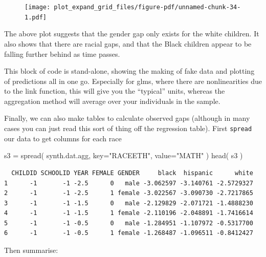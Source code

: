 \documentclass[
  letterpaper,
  DIV=11,
  numbers=noendperiod]{scrreprt}
\newenvironment{Shaded}{\begin{snugshade}}{\end{snugshade}}
\newcommand{\AttributeTok}[1]{\textcolor[rgb]{0.49,0.56,0.16}{#1}}
\newcommand{\FunctionTok}[1]{\textcolor[rgb]{0.02,0.16,0.49}{#1}}
\newcommand{\NormalTok}[1]{\textcolor[rgb]{0.00,0.44,0.13}{#1}}
\newcommand{\OtherTok}[1]{\textcolor[rgb]{0.00,0.44,0.13}{#1}}
\newcommand{\StringTok}[1]{\textcolor[rgb]{0.25,0.44,0.63}{#1}}
\begin{document}
\begin{figure}[H]

{\centering \texttt{[image: plot\_expand\_grid\_files/figure-pdf/unnamed-chunk-34-1.pdf]}

}

\end{figure}

The above plot suggests that the gender gap only exists for the white
children. It also shows that there are racial gaps, and that the Black
children appear to be falling further behind as time passes.

This block of code is stand-alone, showing the making of fake data and
plotting of predictions all in one go. Especially for glms, where there
are nonlinearities due to the link function, this will give you the
``typical'' units, whereas the aggregation method will average over your
individuals in the sample.

Finally, we can also make tables to calculate observed gaps (although in
many cases you can just read this sort of thing off the regression
table). First \texttt{spread} our data to get columns for each race

\begin{Shaded}
\begin{Highlighting}[]
\NormalTok{s3 }\OtherTok{=} \FunctionTok{spread}\NormalTok{( synth.dat.agg, }\AttributeTok{key=}\StringTok{"RACEETH"}\NormalTok{, }\AttributeTok{value=}\StringTok{"MATH"}\NormalTok{ )}
\FunctionTok{head}\NormalTok{( s3 )}
\end{Highlighting}
\end{Shaded}

\begin{verbatim}
  CHILDID SCHOOLID YEAR FEMALE GENDER     black  hispanic      white
1      -1       -1 -2.5      0   male -3.062597 -3.140761 -2.5729327
2      -1       -1 -2.5      1 female -3.022567 -3.090730 -2.7217865
3      -1       -1 -1.5      0   male -2.129829 -2.071721 -1.4888230
4      -1       -1 -1.5      1 female -2.110196 -2.048891 -1.7416614
5      -1       -1 -0.5      0   male -1.284951 -1.107972 -0.5317700
6      -1       -1 -0.5      1 female -1.268487 -1.096511 -0.8412427
\end{verbatim}

Then summarise:
\end{document}
